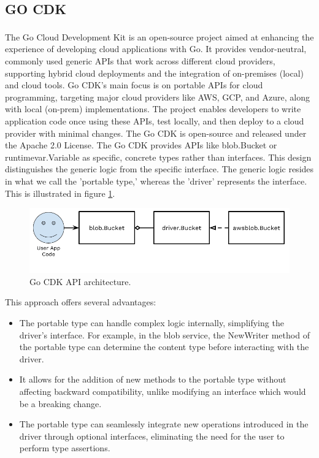 \subsection{GO CDK}
The Go Cloud Development Kit\textsuperscript{\cite{tech_11}} is an open-source project aimed at
enhancing the experience of developing cloud applications with Go. It provides vendor-neutral,
commonly used generic APIs that work across different cloud providers, supporting hybrid cloud
deployments and the integration of on-premises (local) and cloud tools. Go CDK's main focus is on
portable APIs for cloud programming, targeting major cloud providers like AWS, GCP, and Azure, along
with local (on-prem) implementations. The project enables developers to write application code once
using these APIs, test locally, and then deploy to a cloud provider with minimal changes. The Go CDK
is open-source and released under the Apache 2.0 License. \newline\newline
The Go CDK provides APIs like blob.Bucket or runtimevar.Variable as specific, concrete types rather
than interfaces. This design distinguishes the generic logic from the specific interface. The
generic logic resides in what we call the 'portable type,' whereas the 'driver' represents the
interface. This is illustrated in figure \ref{fig:3_go_cdk}.

\begin{figure}
    \centering
    \includegraphics[scale=0.5]{Pictures/3_go_cdk.png}
    \caption{Go CDK API architecture.}
    \label{fig:3_go_cdk}
\end{figure}

This approach offers several advantages:
\begin{itemize}
    \item The portable type can handle complex logic internally, simplifying the driver's interface.
          For example, in the blob service, the NewWriter method of the portable type can determine the
          content type before interacting with the driver.
    \item It allows for the addition of new methods to the portable type without affecting backward
          compatibility, unlike modifying an interface which would be a breaking change.
    \item The portable type can seamlessly integrate new operations introduced in the driver through
          optional interfaces, eliminating the need for the user to perform type assertions.
\end{itemize}

